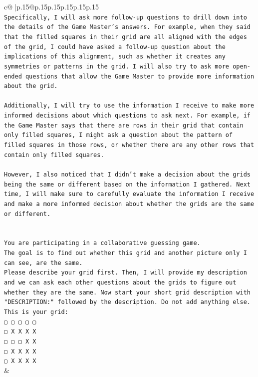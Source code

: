 \documentclass{article}
\begin{document}
{\begin{supertabular}{c@{$\;$}|p{.15\linewidth}@{}p{.15\linewidth}p{.15\linewidth}p{.15\linewidth}p{.15\linewidth}p{.15\linewidth}}
{{{\\ 
\texttt{Specifically, I will ask more follow{-}up questions to drill down into the details of the Game Master's answers. For example, when they said that the filled squares in their grid are all aligned with the edges of the grid, I could have asked a follow{-}up question about the implications of this alignment, such as whether it creates any symmetries or patterns in the grid. I will also try to ask more open{-}ended questions that allow the Game Master to provide more information about the grid.} \\
\\ 
\texttt{Additionally, I will try to use the information I receive to make more informed decisions about which questions to ask next. For example, if the Game Master says that there are rows in their grid that contain only filled squares, I might ask a question about the pattern of filled squares in those rows, or whether there are any other rows that contain only filled squares.} \\
\\ 
\texttt{However, I also noticed that I didn't make a decision about the grids being the same or different based on the information I gathered. Next time, I will make sure to carefully evaluate the information I receive and make a more informed decision about whether the grids are the same or different.} \\
\\ 
\\ 
\texttt{You are participating in a collaborative guessing game.} \\
\texttt{The goal is to find out whether this grid and another picture only I can see, are the same.} \\
\texttt{Please describe your grid first. Then, I will provide my description and we can ask each other questions about the grids to figure out whether they are the same. Now start your short grid description with "DESCRIPTION:" followed by the description. Do not add anything else. This is your grid:} \\
\texttt{▢ ▢ ▢ ▢ ▢} \\
\texttt{▢ X X X X} \\
\texttt{▢ ▢ ▢ X X} \\
\texttt{▢ X X X X} \\
\texttt{▢ X X X X} \\
            }
        }
    }
    & \\ \\


\end{supertabular}}
\end{document}
